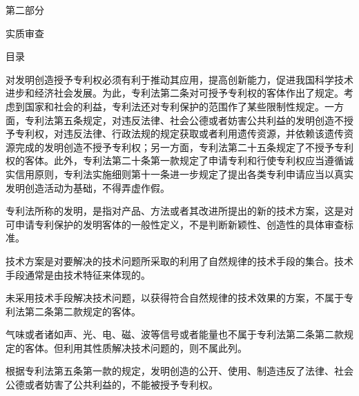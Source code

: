 \cleardoublepage{}\resetchapters
\thispagestyle{plainempty}\hypertarget{gpos.p2}{}\begingroup\centering\guidecenterpage
\dadati\fontsize{29.04bp}{43bp}\selectfont
\vspace*{242bp}
第二部分\par
实质审查\par
{}
{}
\endgroup\clearpage
\cleardoublepage\pagestyle{tocpage}
\gdef\guidetabcontent{\hbox{第}\hbox{二}\hbox{部}\hbox{分}}
{\centering\guidecenterpage\heiti\fontsize{14.04bp}{21bp}\selectfont 目\quad 录\par}
\vspace{6bp}
\clearpage\pagestyle{main}
对发明创造授予专利权必须有利于推动其应用，提高创新能力，促进我国科学技术进步和经济社会发展。为此，专利法第二条对可授予专利权的客体作出了规定。考虑到国家和社会的利益，专利法还对专利保护的范围作了某些限制性规定。一方面，专利法第五条规定，对违反法律、社会公德或者妨害公共利益的发明创造不授予专利权，对违反法律、行政法规的规定获取或者利用遗传资源，并依赖该遗传资源完成的发明创造不授予专利权；另一方面，专利法第二十五条规定了不授予专利权的客体。此外，专利法第二十条第一款规定了申请专利和行使专利权应当遵循诚实信用原则，专利法实施细则第十一条进一步规定了提出各类专利申请应当以真实发明创造活动为基础，不得弄虚作假。

专利法所称的发明，是指对产品、方法或者其改进所提出的新的技术方案，这是对可申请专利保护的发明客体的一般性定义，不是判断新颖性、创造性的具体审查标准。

技术方案是对要解决的技术问题所采取的利用了自然规律的技术手段的集合。技术手段通常是由技术特征来体现的。

未采用技术手段解决技术问题，以获得符合自然规律的技术效果的方案，不属于专利法第二条第二款规定的客体。

气味或者诸如声、光、电、磁、波等信号或者能量也不属于专利法第二条第二款规定的客体。但利用其性质解决技术问题的，则不属此列。

根据专利法第五条第一款的规定，发明创造的公开、使用、制造违反了法律、社会公德或者妨害了公共利益的，不能被授予专利权。

